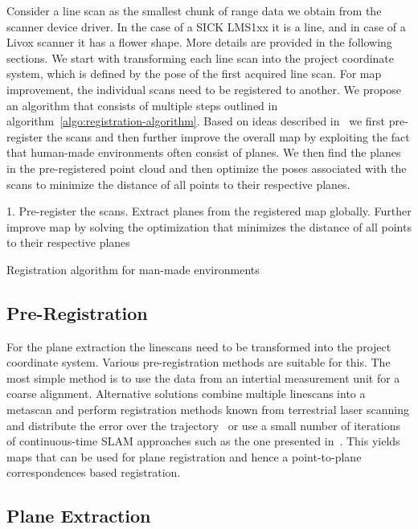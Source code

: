 \documentclass[5p]{elsarticle}
\begin{document}
Consider a line scan as the smallest chunk of range data we obtain from the scanner device driver.
In the case of a SICK LMS1xx it is a line, and in case of a Livox scanner it has a flower shape.
More details are provided in the following sections.
We start with transforming each line scan into the project coordinate system, which is defined by the pose of the first acquired line scan.
%
For map improvement, the individual scans need to be registered to another. 
We propose an algorithm that consists of multiple steps outlined in algorithm~\ref{algo:registration-algorithm}. 
Based on ideas described in~\cite{Borrmann2010} we first pre-register the scans and then further improve the overall map by exploiting the fact that human-made environments often consist of planes. 
We then find the planes in the pre-registered point cloud and then optimize the poses associated with the scans to minimize the distance of all points to their respective planes. 

\begin{algorithm}
    \SetAlgoLined
    1. Pre-register the scans. Extract planes from the registered map globally. Further improve map by solving the optimization that minimizes the distance of all points to their respective planes\;
    \caption{Registration algorithm for man-made environments}
    \label{algo:registration-algorithm}
\end{algorithm}

\subsection{Pre-Registration}

For the plane extraction the linescans need to be transformed into the project coordinate system.
Various pre-registration methods are suitable for this.
The most simple method is to use the data from an intertial measurement unit for a coarse alignment.
Alternative solutions combine multiple linescans into a metascan and perform registration methods known from terrestrial laser scanning and distribute the error over the trajectory~\cite{Stoyanov2009,Bosse2009} or use a small number of iterations of continuous-time SLAM approaches such as the one presented in~\cite{REMSEN2013}.
This yields maps that can be used for plane registration and hence a point-to-plane correspondences based registration.

\subsection{Plane Extraction}
\end{document}
